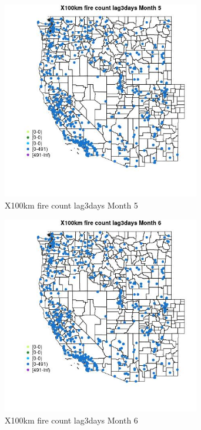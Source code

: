 \begin{figure} 
\centering  
\includegraphics[width=0.77\textwidth]{Code_Outputs/Report_ML_input_PM25_Step4_part_e_de_duplicated_aves_compiled_2019-05-14wNAs_MapObsMo5X100km_fire_count_lag3days.jpg} 
\caption{\label{fig:Report_ML_input_PM25_Step4_part_e_de_duplicated_aves_compiled_2019-05-14wNAsMapObsMo5X100km_fire_count_lag3days}X100km fire count lag3days Month 5} 
\end{figure} 
 

\begin{figure} 
\centering  
\includegraphics[width=0.77\textwidth]{Code_Outputs/Report_ML_input_PM25_Step4_part_e_de_duplicated_aves_compiled_2019-05-14wNAs_MapObsMo6X100km_fire_count_lag3days.jpg} 
\caption{\label{fig:Report_ML_input_PM25_Step4_part_e_de_duplicated_aves_compiled_2019-05-14wNAsMapObsMo6X100km_fire_count_lag3days}X100km fire count lag3days Month 6} 
\end{figure} 
 

